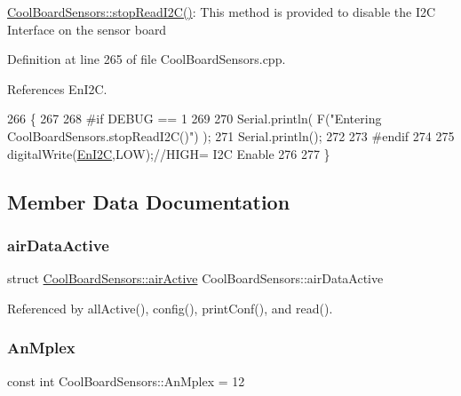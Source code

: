 \hyperlink{classCoolBoardSensors_ab67b900b9e5e7c18d52d2d9107ba171b}{Cool\+Board\+Sensors\+::stop\+Read\+I2\+C()}\+: This method is provided to disable the I2C Interface on the sensor board 

Definition at line 265 of file Cool\+Board\+Sensors.\+cpp.



References En\+I2C.


\begin{DoxyCode}
266 \{
267 
268 \textcolor{preprocessor}{#if DEBUG == 1}
269 
270     Serial.println( F(\textcolor{stringliteral}{"Entering CoolBoardSensors.stopReadI2C()"}) );
271     Serial.println();
272 
273 \textcolor{preprocessor}{#endif}
274 
275     digitalWrite(\hyperlink{classCoolBoardSensors_aaa6b5dbf3a6633bffd9d204d961096dc}{EnI2C},LOW);\textcolor{comment}{//HIGH= I2C Enable}
276 
277 \}
\end{DoxyCode}


\subsection{Member Data Documentation}
\mbox{\label{classCoolBoardSensors_abff8dfeccb2f7689847bb64d5f1cd31e}} 
\subsubsection{\texorpdfstring{air\+Data\+Active}{airDataActive}}
{\footnotesize\ttfamily struct \hyperlink{structCoolBoardSensors_1_1airActive}{Cool\+Board\+Sensors\+::air\+Active} Cool\+Board\+Sensors\+::air\+Data\+Active\hspace{0.3cm}{\ttfamily [private]}}



Referenced by all\+Active(), config(), print\+Conf(), and read().

\mbox{\label{classCoolBoardSensors_a12ef28b1046219e0aee10bf64e28c4a5}} 
\subsubsection{\texorpdfstring{An\+Mplex}{AnMplex}}
{\footnotesize\ttfamily const int Cool\+Board\+Sensors\+::\+An\+Mplex = 12\hspace{0.3cm}{\ttfamily [private]}}




